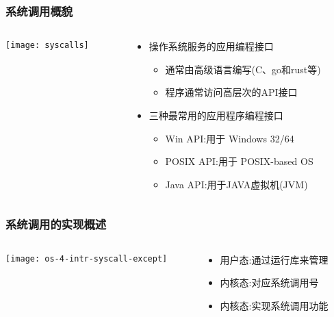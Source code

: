 \begin{frame}
	\frametitle{系统调用概貌}
	
	
	\begin{columns}
		
		\begin{column}{0.4\textwidth}
			\centering
			\texttt{[image: syscalls]}
			
			
		\end{column}
		
		\begin{column}{0.5\textwidth}
			
			\begin{itemize}
				\item 操作系统服务的应用编程接口
				\begin{itemize}
					\item 通常由高级语言编写(C、go和rust等)
					\item 程序通常访问高层次的API接口
				\end{itemize}\pause
				\item 三种最常用的应用程序编程接口
				\begin{itemize}
					\item Win API:用于 Windows 32/64
					\item POSIX API:用于 POSIX-based OS
					\item Java API:用于JAVA虚拟机(JVM)
				\end{itemize}
			\end{itemize}
			
		\end{column}
	\end{columns}
	
\end{frame}

\begin{frame}[plain]
	\frametitle{系统调用的实现概述}
	\begin{columns}
		
		\begin{column}{0.45\textwidth}
			\centering
			\texttt{[image: os-4-intr-syscall-except]}
			
		\end{column}
		
		\begin{column}{0.5\textwidth}
			
			\begin{itemize}  
				\item 用户态:通过运行库来管理 \pause
				\item 内核态:对应系统调用号
				\item 内核态:实现系统调用功能

				
			\end{itemize}
			
		\end{column}
		
	\end{columns}
	
\end{frame}


